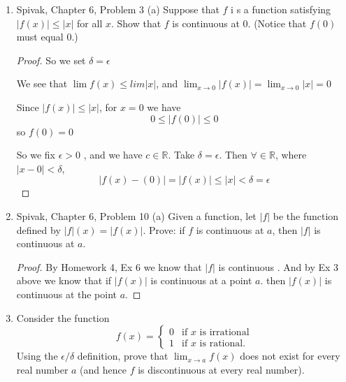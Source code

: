 \documentclass{article} %
\theoremstyle{plain}
\theoremstyle{definition}
\theoremstyle{case}
\newcommand{\abs}[1]{\left\lvert #1 \right\rvert} %
\begin{document}
\begin{enumerate}[label={\fbox{\textbf{Exercise \#\arabic* :}}}]
\newpage
\item Spivak, Chapter 6, Problem 3 (a)
  Suppose that $f$ i s a function satisfying $|f(x)| \leq |x|$
  for all $x$. Show that $f$ is continuous at $0$. (Notice that $f(0)$
  must equal 0.)


\begin{proof}
      So we set $\delta = \epsilon$

      We see that $\lim f(x) \leq lim |x|$, and
      $\lim_{x \to 0} |f(x)| = \lim_{x \to 0} |x| = 0$

      Since $|f(x)| \leq |x|$, for $x=0$ we have
      \[ 0 \leq |f(0)| \leq 0 \]
      so $f(0) = 0$

      So we fix $\epsilon > 0$ , and we have $c \in \mathbb{R}$.  Take
      $\delta = \epsilon$.  Then $\forall \in \mathbb{R}$, where $|x-0| < \delta$,
      \[ |f(x) - (0)| = |f(x)| \leq |x| < \delta = \epsilon \]

\end{proof}


\newpage
\item Spivak, Chapter 6, Problem 10 (a)
  Given a function, let $\abs{f}$ be the function defined by
  $\abs{f}(x) = \abs{f(x)}$. Prove: if $f$ is continuous at $a$, then
  $\abs{f}$ is continuous at $a$.

\begin{proof}
  By Homework 4, Ex 6 we know that $|f|$ is continuous .  And by Ex 3 above
  we know that if $|f(x)|$ is continuous at a point $a$. then $|f(x)|$
  is continuous at the point $a$.
\end{proof}


\newpage
\item Consider the function
$$f(x) = \begin{cases} 0 & \text{if $x$ is irrational} \\
1 & \text{if $x$ is rational.}
\end{cases}
$$
Using the $\epsilon/\delta$ definition, prove that $\lim_{x \rightarrow a} f(x)$ does not exist for every real number $a$ (and hence $f$ is discontinuous at every real number).


\end{enumerate}
\end{document}
